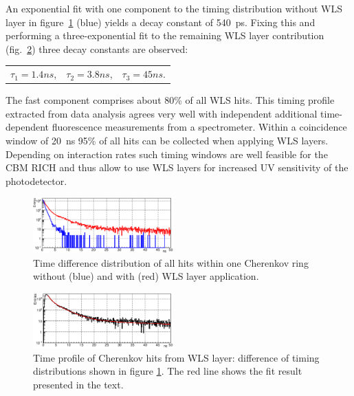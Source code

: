\documentclass[final,5p,times,twocolumn]{elsarticle}
\begin{document}
An exponential fit with one component to the timing distribution without WLS layer in figure~\ref{fig:WLS} (blue) yields a decay constant of 540~ps. Fixing this and performing a three-exponential fit to the remaining WLS layer contribution (fig.~\ref{fig:WLSdiff}) three decay constants are observed:
\begin{center}
\begin{tabular}{ c c c }
$ \tau_1 = 1.4 ns $, & $ \tau_2 = 3.8 ns $, & $ \tau_3 = 45 ns $. \\
\end{tabular}
\end{center}
The fast component comprises about 80\% of all WLS hits. This timing profile extracted from data analysis agrees very well with independent additional time-dependent fluorescence measurements from a spectrometer.
Within a coincidence window of 20~ns 95\% of all hits can be collected when applying WLS layers. Depending on interaction rates such timing windows are well feasible for the CBM RICH and thus allow to use WLS layers for increased UV sensitivity of the photodetector.

\begin{figure}[h]
	\centering
	\includegraphics[width=0.48\textwidth]{figures/Two_curves_1Nov.eps}
	\caption{Time difference distribution of all hits within one Cherenkov ring without (blue) and with (red) WLS layer application.}
	\label{fig:WLS}
\end{figure}

\begin{figure}[h]
	\centering
	\includegraphics[width=0.48\textwidth]{figures/WLSdiff_1Nov.eps}
	\caption{Time profile of Cherenkov hits from WLS layer: difference of timing distributions shown in figure \ref{fig:WLS}. The red line shows the fit result presented in the text.}
	\label{fig:WLSdiff}
\end{figure}

\end{document}
